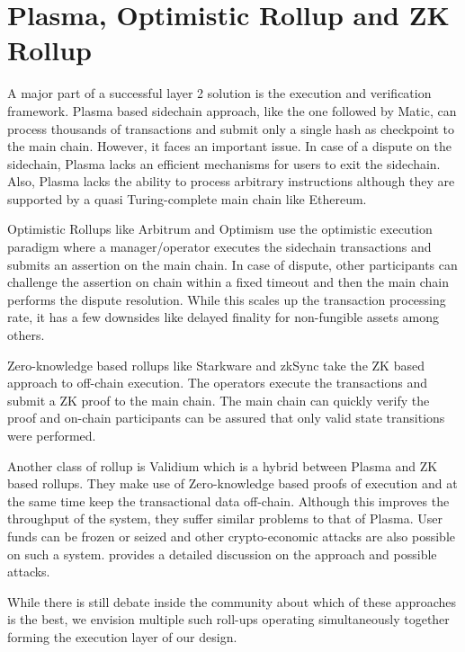 \documentclass[sigconf, screen=true, nonacm]{acmart}
\begin{document}
\section{Plasma, Optimistic Rollup and ZK Rollup}\label{rollup}
    A major part of a successful layer 2 solution is the execution and verification framework. Plasma based sidechain approach, like the one followed by Matic, can process thousands of transactions and submit only a single hash as checkpoint to the main chain. However, it faces an important issue. In case of a dispute on the sidechain, Plasma lacks an efficient mechanisms for users to exit the sidechain. Also, Plasma lacks the ability to process arbitrary instructions although they are supported by a quasi Turing-complete main chain like Ethereum. 

    Optimistic Rollups like Arbitrum and Optimism use the optimistic execution paradigm where a manager/operator executes the sidechain transactions and submits an assertion on the main chain. In case of dispute, other participants can challenge the assertion on chain within a fixed timeout and then the main chain performs the dispute resolution. While this scales up the transaction processing rate, it has a few downsides like delayed finality for non-fungible assets among others. 

    Zero-knowledge based rollups like Starkware and zkSync take the ZK based approach to off-chain execution. The operators execute the transactions and submit a ZK proof to the main chain. The main chain can quickly verify the proof and on-chain participants can be assured that only valid state transitions were performed. 

    Another class of rollup is Validium which is a hybrid between Plasma and ZK based rollups. They make use of Zero-knowledge based proofs of execution and at the same time keep the transactional data off-chain. Although this improves the throughput of the system, they suffer similar problems to that of Plasma. User funds can be frozen or seized and other crypto-economic attacks are also possible on such a system. \cite{StarkEx:2020} provides a detailed discussion on the approach and possible attacks. 

    While there is still debate inside the community about which of these approaches is the best, we envision multiple such roll-ups operating simultaneously together forming the execution layer of our design. 
\end{document}
